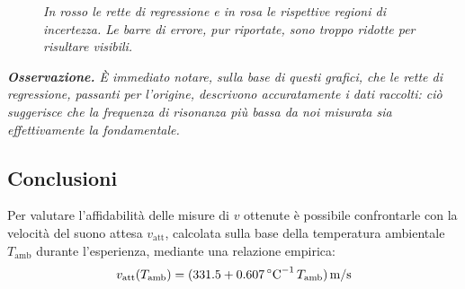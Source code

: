 \documentclass{article}
\begin{document}
\begin{figure}[H]
  \hfil
  \hfil
  \caption*{\emph{
    In rosso le rette di regressione e in rosa le rispettive regioni di incertezza.
    Le barre di errore, pur riportate, sono troppo ridotte per risultare visibili.
  }}
\end{figure}

\vspace{3mm}
\emph{
  \textbf{Osservazione.} È immediato notare, sulla base di questi grafici,
  che le rette di regressione, passanti per l'origine, descrivono accuratamente
  i dati raccolti: ciò suggerisce che la frequenza di risonanza più bassa da noi
  misurata sia effettivamente la fondamentale.
}

\subsection{Conclusioni}

Per valutare l'affidabilità delle misure di $v$ ottenute è
possibile confrontarle con la velocità del suono attesa
$v_\text{att}$, calcolata sulla base della temperatura
ambientale $T_\text{amb}$ durante l'esperienza, mediante una
relazione empirica:
\[
  v_\text{att}(T_\text{amb}) = (331.5 +
  \qty{0.607}{{\degree C}^{-1}}\,T_\text{amb})\,\unit{m \per s}
\]
\end{document}
